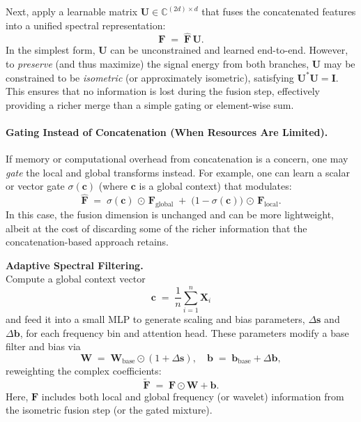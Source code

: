 Next, apply a learnable matrix 
\(\mathbf{U} \in \mathbb{C}^{(2d) \times d}\) 
that fuses the concatenated features into a unified spectral representation:
\[
\mathbf{F} \;=\; \hat{\mathbf{F}} \,\mathbf{U}.
\]
In the simplest form, \(\mathbf{U}\) can be unconstrained and learned end-to-end. However, to \emph{preserve} (and thus maximize) the signal energy from both branches, \(\mathbf{U}\) may be constrained to be \emph{isometric} (or approximately isometric), satisfying \(\mathbf{U}^* \mathbf{U} = \mathbf{I}\). This ensures that no information is lost during the fusion step, effectively providing a richer merge than a simple gating or element-wise sum.

\paragraph{Gating Instead of Concatenation (When Resources Are Limited).}
If memory or computational overhead from concatenation is a concern, one may \emph{gate} the local and global transforms instead. For example, one can learn a scalar or vector gate \(\sigma(\mathbf{c})\) (where \(\mathbf{c}\) is a global context) that modulates:
\[
\hat{\mathbf{F}} \;=\; \sigma(\mathbf{c}) \,\odot\, \mathbf{F}_{\mathrm{global}} \;+\; \bigl(1-\sigma(\mathbf{c})\bigr) \,\odot\, \mathbf{F}_{\mathrm{local}}.
\]
In this case, the fusion dimension is unchanged and can be more lightweight, albeit at the cost of discarding some of the richer information that the concatenation-based approach retains.

\textbf{ Adaptive Spectral Filtering.}\\
Compute a global context vector
\[
\mathbf{c} \;=\; \frac{1}{n} \sum_{i=1}^{n} \mathbf{X}_i
\]
and feed it into a small MLP to generate scaling and bias parameters, \(\Delta \mathbf{s}\) and \(\Delta \mathbf{b}\), for each frequency bin and attention head. These parameters modify a base filter and bias via
\[
\mathbf{W} \;=\; \mathbf{W}_{\mathrm{base}} \odot (1 + \Delta \mathbf{s}), 
\quad
\mathbf{b} \;=\; \mathbf{b}_{\mathrm{base}} + \Delta \mathbf{b},
\]
reweighting the complex coefficients:
\[
\tilde{\mathbf{F}} \;=\; \mathbf{F} \odot \mathbf{W} + \mathbf{b}.
\]
Here, \(\mathbf{F}\) includes both local and global frequency (or wavelet) information from the isometric fusion step (or the gated mixture).

